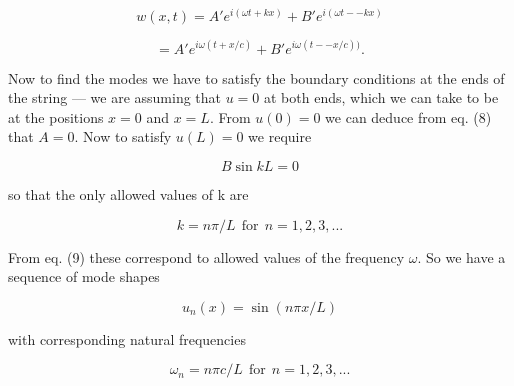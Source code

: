   \begin{equation*}w(x,t) = A' e^{i(\omega t + kx)} + B' e^{i(\omega t -- kx)} 
  \tag{11}\end{equation*} 

  \begin{equation*}=A' e^{i\omega (t + x/c)} + B' e^{i\omega (t -- x/c))}. 
  \tag{12}\end{equation*} 

  Now to find the modes we have to satisfy the boundary conditions at the ends 
  of the string --- we are assuming that $u = 0$ at both ends, which we can 
  take to be at the positions $x = 0$ and $x = L$. From $u(0) = 0$ we can 
  deduce from eq. (8) that $A = 0$. Now to satisfy $u(L) = 0$ we require 

  \begin{equation*}B \sin kL = 0 \tag{12}\end{equation*} 

  \noindent{}so that the only allowed values of k are 

  \begin{equation*}k=n \pi/L \mathrm{~~for~~} n = 1, 2, 3, ... 
  \tag{13}\end{equation*} 

  From eq. (9) these correspond to allowed values of the frequency $\omega$. So 
  we have a sequence of mode shapes 

  \begin{equation*}u_n(x)=\sin (n \pi x/L) \tag{14}\end{equation*} 

  \noindent{}with corresponding natural frequencies 

  \begin{equation*}\omega_n = n \pi c/L \mathrm{~~for~~} n = 1, 2, 3, ... 
  \tag{15}\end{equation*} 